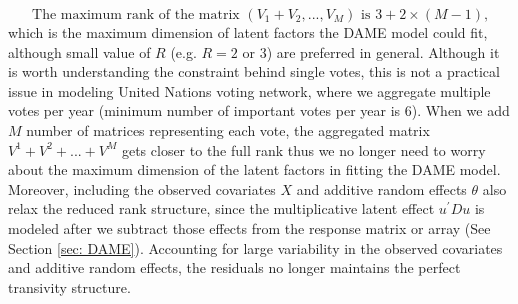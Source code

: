 \documentclass[a4paper]{article}
\begin{document}
\begin{equation*}
\mbox{The maximum rank of the matrix $(V_1+V_2,...,V_M)$ is $3 + 2\times (M-1)$,}
\end{equation*}
which is the maximum dimension of latent factors the DAME model could fit, although small value of $R$ (e.g. $R=2$ or $3$) are preferred in general. \fi 
Although it is worth understanding the constraint behind single votes, this is not a practical issue in modeling United Nations voting network, where we aggregate multiple votes per year (minimum number of important votes per year is 6). When we add $M$ number of matrices representing each vote, the aggregated matrix $V^1+V^2+...+V^M$ gets closer to the full rank thus we no longer need to worry about the maximum dimension of the latent factors in fitting the DAME model. Moreover, including the observed covariates $X$ and additive random effects $\theta$ also relax the reduced rank structure, since the multiplicative latent effect $u^\prime Du$ is modeled after we subtract those effects from the response matrix or array (See Section \ref{sec: DAME}). Accounting for large variability in the observed covariates and additive random effects, the residuals no longer maintains the perfect transivity structure.
\end{document}
